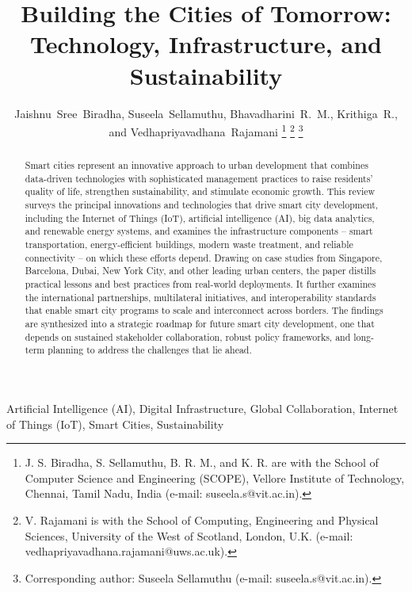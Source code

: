 \documentclass[journal]{IEEEtran}
\begin{document}
\title{Building the Cities of Tomorrow: Technology, Infrastructure, and Sustainability}

\author{Jaishnu~Sree~Biradha, Suseela~Sellamuthu, Bhavadharini~R.~M., Krithiga~R., and Vedhapriyavadhana~Rajamani%
\thanks{J. S. Biradha, S. Sellamuthu, B. R. M., and K. R. are with the School of Computer Science and Engineering (SCOPE), Vellore Institute of Technology, Chennai, Tamil Nadu, India (e-mail: suseela.s@vit.ac.in).}%
\thanks{V. Rajamani is with the School of Computing, Engineering and Physical Sciences, University of the West of Scotland, London, U.K. (e-mail: vedhapriyavadhana.rajamani@uws.ac.uk).}%
\thanks{Corresponding author: Suseela Sellamuthu (e-mail: suseela.s@vit.ac.in).}%
}


\maketitle

\begin{abstract}
Smart cities represent an innovative approach to urban development that combines data-driven technologies with sophisticated management practices to raise residents' quality of life, strengthen sustainability, and stimulate economic growth. This review surveys the principal innovations and technologies that drive smart city development, including the Internet of Things (IoT), artificial intelligence (AI), big data analytics, and renewable energy systems, and examines the infrastructure components -- smart transportation, energy-efficient buildings, modern waste treatment, and reliable connectivity -- on which these efforts depend. Drawing on case studies from Singapore, Barcelona, Dubai, New York City, and other leading urban centers, the paper distills practical lessons and best practices from real-world deployments. It further examines the international partnerships, multilateral initiatives, and interoperability standards that enable smart city programs to scale and interconnect across borders. The findings are synthesized into a strategic roadmap for future smart city development, one that depends on sustained stakeholder collaboration, robust policy frameworks, and long-term planning to address the challenges that lie ahead.
\end{abstract}

\begin{IEEEkeywords}
Artificial Intelligence (AI), Digital Infrastructure, Global Collaboration, Internet of Things (IoT), Smart Cities, Sustainability
\end{IEEEkeywords}
\end{document}
